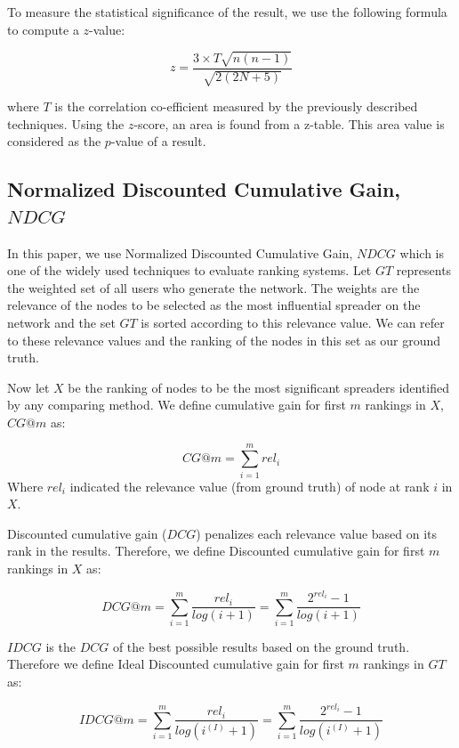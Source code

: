 \documentclass[sigconf]{acmart}
\begin{document}
To measure the statistical significance of the result, we use the following formula to compute a $z$-value:

\begin{equation}
z = \dfrac{3 \times T \sqrt{n(n-1)}}{\sqrt{2(2N+5)}}
\end{equation}

where $T$ is the correlation co-efficient measured by the previously described techniques. Using the $z$-score, an area is found from a z-table. This area value is considered as the $p$-value of a result.


\subsection{Normalized Discounted Cumulative Gain, $NDCG$}
In this paper, we use Normalized Discounted Cumulative Gain, $NDCG$ which is one of the widely used techniques to evaluate ranking systems. Let $GT$ represents the weighted set of all users who generate the network. The weights are the relevance of the nodes to be selected as the most influential spreader on the network and the set $GT$ is sorted according to this relevance value. We can refer to these relevance values and the ranking of the nodes in this set as our ground truth.

Now let $X$ be the ranking of nodes to be the most significant spreaders identified by any comparing method. We define cumulative gain for first $m$ rankings in $X$, $CG@m$ as:

\begin{equation}
CG@m = \sum_{i=1}^{m} rel_i
\end{equation} 
Where $rel_i$ indicated the relevance value (from ground truth) of node at rank $i$ in $X$.

Discounted cumulative gain ($DCG$) penalizes each relevance value based on its rank in the results. Therefore, we define Discounted cumulative gain for first $m$ rankings in $X$ as:

\begin{equation}
DCG@m = \sum_{i=1}^{m} \dfrac{rel_i}{log(i+1)} = \sum_{i=1}^{m} \dfrac{2^{rel_i}-1}{log(i+1)}
\end{equation}

$IDCG$ is the $DCG$ of the best possible results based on the ground truth. Therefore we define Ideal Discounted cumulative gain for first $m$ rankings in $GT$ as:
 
\begin{equation}
IDCG@m = \sum_{i=1}^{m} \dfrac{rel_i}{log(i^{(I)}+1)} = \sum_{i=1}^{m} \dfrac{2^{rel_i}-1}{log(i^{(I)}+1)}
\end{equation}
\end{document}
